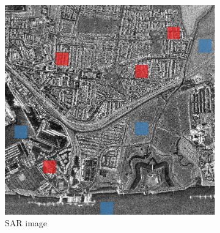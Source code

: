 \documentclass[
  lettersize  journal,
]{IEEEtran}%
\providecommand{\DIFaddtex}[1]{{\protect\color{blue}\uwave{#1}}} %
\providecommand{\DIFaddFL}[1]{\DIFadd{#1}} %
\providecommand{\DIFaddbeginFL}{} %
\providecommand{\DIFaddendFL}{} %
\providecommand{\DIFdelbeginFL}{} %
\providecommand{\DIFdelendFL}{} %
\providecommand{\DIFadd}[1]{\texorpdfstring{\DIFaddtex{#1}}{#1}} %
\newcommand{\DIFscaledelfig}{0.5}
\newlength{\DIFdelgraphicswidth} %
\newlength{\DIFdelgraphicsheight} %
\newcommand{\DIFaddincludegraphics}[2][]{{\color{blue}\fbox{\DIFOincludegraphics[#1]{#2}}}} %
\newcommand{\DIFdelincludegraphics}[2][]{%
\sbox{\DIFdelgraphicsbox}{\DIFOincludegraphics[#1]{#2}}%
\settoboxwidth{\DIFdelgraphicswidth}{\DIFdelgraphicsbox} %
\settoboxtotalheight{\DIFdelgraphicsheight}{\DIFdelgraphicsbox} %
\scalebox{\DIFscaledelfig}{%
\parbox[b]{\DIFdelgraphicswidth}{\usebox{\DIFdelgraphicsbox}\\[-\baselineskip] \rule{\DIFdelgraphicswidth}{0em}}\llap{\resizebox{\DIFdelgraphicswidth}{\DIFdelgraphicsheight}{%
\setlength{\unitlength}{\DIFdelgraphicswidth}%
\begin{picture}(1,1)%
\thicklines\linethickness{2pt} %
{\color[rgb]{1,0,0}\put(0,0){\framebox(1,1){}}}%
{\color[rgb]{1,0,0}\put(0,0){\line( 1,1){1}}}%
{\color[rgb]{1,0,0}\put(0,1){\line(1,-1){1}}}%
\end{picture}%
}\hspace*{3pt}}} %
} %
\DeclareRobustCommand{\DIFaddbeginFL}{\DIFOaddbeginFL \let\includegraphics\DIFaddincludegraphics} %
\DeclareRobustCommand{\DIFaddendFL}{\DIFOaddendFL \let\includegraphics\DIFOincludegraphics} %
\DeclareRobustCommand{\DIFdelbeginFL}{\DIFOdelbeginFL \let\includegraphics\DIFdelincludegraphics} %
\DeclareRobustCommand{\DIFdelendFL}{\DIFOaddendFL \let\includegraphics\DIFOincludegraphics} %
\begin{document}
\begin{figure}[hbt]
    \centering
    \DIFdelbeginFL %
\DIFdelendFL \DIFaddbeginFL \begin{subfigure}{0.145\textwidth}
        \includegraphics[width=\linewidth]{./Figures-R1/london_roi.png}
        \DIFaddendFL \caption{SAR image}
        \DIFdelbeginFL %
\DIFdelendFL \DIFaddbeginFL \label{fig:london-sar}
    \DIFaddendFL \end{subfigure}
    \DIFdelbeginFL %
\DIFdelendFL \DIFaddbeginFL \DIFaddFL{\hspace{0.00001\textwidth}
    }\begin{subfigure}{0.142\textwidth}

\end{subfigure}
\end{figure}
\end{document}
